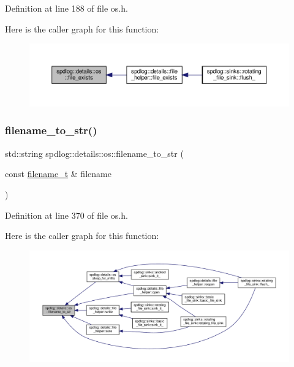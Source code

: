 Definition at line 188 of file os.\+h.

Here is the caller graph for this function\+:
\nopagebreak
\begin{figure}[H]
\begin{center}
\leavevmode
\includegraphics[width=350pt]{namespacespdlog_1_1details_1_1os_a0831288e524f8cf53c98bce8facd0a0c_icgraph}
\end{center}
\end{figure}
\mbox{\label{namespacespdlog_1_1details_1_1os_ac7c0d6af1f3f652f23e57f057217b9a7}} 
\subsubsection{\texorpdfstring{filename\+\_\+to\+\_\+str()}{filename\_to\_str()}}
{\footnotesize\ttfamily std\+::string spdlog\+::details\+::os\+::filename\+\_\+to\+\_\+str (\begin{DoxyParamCaption}\item[{const \hyperlink{namespacespdlog_acf7ce125b3622e44f8f1702d699e0b06}{filename\+\_\+t} \&}]{filename }\end{DoxyParamCaption})\hspace{0.3cm}{\ttfamily [inline]}}



Definition at line 370 of file os.\+h.

Here is the caller graph for this function\+:
\nopagebreak
\begin{figure}[H]
\begin{center}
\leavevmode
\includegraphics[width=350pt]{namespacespdlog_1_1details_1_1os_ac7c0d6af1f3f652f23e57f057217b9a7_icgraph}
\end{center}
\end{figure}
\mbox{\label{namespacespdlog_1_1details_1_1os_a6d2fb5a293e8515f651288992d5443cc}} 
